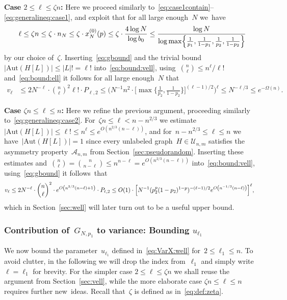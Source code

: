 \documentclass{article}
\newcommand{\cA}{\mathcal{A}}
\newcommand{\T}{\mathcal{U}_{n,m}}
\newcommand\lrpar[1]{\left(#1\right)}
\newcommand\abs[1]{\left|#1\right|}
\newcommand{\nN}{n_N}
\newcommand{\Aut}{\mathrm{Aut}}
\renewcommand{\u}{u}
\renewcommand{\v}{v}
\newcommand\Biggpar[1]{\Biggl(#1\Biggr)}
\newcommand\Bigsqpar[1]{\Bigl[#1\Bigr]}
\newcommand\biggsqpar[1]{\biggl[#1\biggr]}
\newcommand\Bigcpar[1]{\Bigl\{#1\Bigr\}}
\newcommand\biggcpar[1]{\biggl\{#1\biggr\}}
\newcommand{\refS}[1]{Section~\ref{#1}}
\begin{document}
\textbf{Case $2\le \ell\le \zeta n$:} 
Here we proceed similarly to~\eqref{eq:case1contain}--\eqref{eq:generalineq:case1}, and exploit that for all large enough~$N$ we~have 
\begin{equation}\label{eq:bound:ell}
\ell \leq \zeta n \leq \zeta \cdot \nN \le \zeta \cdot x^{(0)}_N(p) \leq \zeta \cdot \frac{4\log N}{\log b_0} \leq \frac{\log N}{\log \max\Bigcpar{\frac{1}{p_1},\frac{1}{1-p_1},\frac{1}{p_2},\frac{1}{1-p_2}}}
\end{equation}
by our choice of~$\zeta$.
Inserting~\eqref{eq:gbound} and the trivial bound~$\abs{\Aut(H[L])} \leq \abs{L}! = \ell!$ into~\eqref{eq:bound:vell}, 
using~$\binom{n}{\ell} \le n^\ell/\ell!$ and~\eqref{eq:bound:ell} it follows for all large enough~$N$ that
\begin{align}\label{eq:cestimate1}
\v_\ell& \leq 2 N^{-\ell} \cdot \binom{n}{\ell}^2
\ell! \cdot P_{\ell,2} 
	\leq \Biggpar{N^{-1}n^{2} \cdot  \biggsqpar{\max\biggcpar{\frac{1}{p_2},\frac{1}{1-p_2}}}^{(\ell-1)/2}}^{\ell} 
 \le N^{-\ell/3} \le e^{-\Omega(n)}.
\end{align}

\textbf{Case $\zeta n\le \ell\le  n$:} 
Here we refine the previous argument, 
proceeding similarly to~\eqref{eq:generalineq:case2}. 
For~$\zeta n \le \ell < n - n^{2/3}$ we estimate~$|\Aut(H[L])| \leq \ell! \le n^{\ell} \le e^{O(n^{2/3}(n-\ell))}$, and for~$n - n^{2/3} \le \ell \le n$ 
we have~$|\Aut(H[L])|=1$ since 
every unlabeled graph~$H \in \T$ satisfies the asymmetry property~$\cA_{n,m}$ from \refS{sec:pseudorandom}. 
Inserting these estimates and~$\binom{n}{\ell}=\binom{n}{n-\ell} \le n^{n-\ell} = e^{O(n^{2/3}(n-\ell))}$ into~\eqref{eq:bound:vell}, using~\eqref{eq:gbound} it  follows~that 
\begin{equation}\label{eq:cestimate4}
\begin{split}
\v_\ell &\leq 2 N^{-\ell} \cdot \binom{n}{\ell}^2 \cdot e^{O\lrpar{n^{2/3}(n-\ell)+1}} \cdot P_{\ell,2} 
\leq O(1) \cdot \Bigsqpar{N^{-1}(p_2^p(1-p_2)^{1-p})^{-(\ell-1)/2} e^{O\lrpar{n^{-1/3}(n-\ell)}}}^\ell,
\end{split}
\end{equation}
which in \refS{sec:well} will later turn out to be a useful upper bound. 



\subsubsection{Contribution of~$G_{N,p_1}$ to variance: Bounding $\u_{\ell_1}$}\label{sec:uell}
We now bound the parameter~$u_{\ell_1}$ defined in~\eqref{eq:VarX:well} for~$2 \le \ell_1 \le n$. 
To avoid clutter, in the following we will drop the index from~$\ell_1$ and simply write~$\ell=\ell_1$ for brevity. 
For the simpler case $2\le \ell\le \zeta n$ we shall reuse the argument from Section~\ref{sec:vell}, while the more elaborate case $\zeta n\le \ell\le n$ requires further new~ideas. 
Recall that~$\zeta$ is defined as in~\eqref{eq:def:zeta}.  
\end{document}
